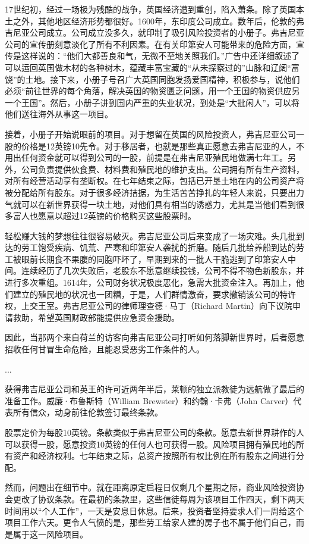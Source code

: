 \documentclass[12pt,oneside]{book}
\begin{document}
\begin{bookref}[frametitle={\cite{美国四百年}}]
17世纪初，经过一场极为残酷的战争，英国经济遭到重创，陷入萧条。除了英国本土之外，其他地区经济形势都很好。1600年，东印度公司成立。数年后，伦敦的弗吉尼亚公司成立。公司成立没多久，就印制了吸引风险投资者的小册子。弗吉尼亚公司的宣传册刻意淡化了所有不利因素。在有关印第安人可能带来的危险方面，宣传是这样说的：“他们大都善良和气，无微不至地关照我们。”广告中还详细叙述了可以运回英国做木材的各种树木，蕴藏丰富宝藏的“从未探察过的”山脉和辽阔“富饶”的土地。接下来，小册子号召广大英国同胞发扬爱国精神，积极参与，说他们必须“前往世界的每个角落，解决英国的物资匮乏问题，用一个王国的物资供应另一个王国”。然后，小册子讲到国内严重的失业状况，到处是“大批闲人”，可以将他们送往海外从事这一项目。

接着，小册子开始说眼前的项目。对于想留在英国的风险投资人，弗吉尼亚公司一股的价格是12英镑10先令。对于移居者，也就是那些真正愿意去弗吉尼亚的人，不用出任何资金就可以得到公司的一股，前提是在弗吉尼亚殖民地做满七年工。另外，公司负责提供伙食费、材料费和殖民地的维护支出。公司拥有所有生产资料，对所有经营活动享有垄断权。在七年结束之际，包括已开垦土地在内的公司资产将被分配给所有股东。对于很多经济拮据，为生活苦苦挣扎的年轻人来说，只要出力气就可以在新世界获得一块土地，对他们具有相当的诱惑力，尤其是当他们看到很多富人也愿意以超过12英镑的价格购买这些股票时。

轻松赚大钱的梦想往往很容易破灭。弗吉尼亚公司后来变成了一场灾难。头几批到达的劳工饱受疾病、饥荒、严寒和印第安人袭扰的折磨。随后几批给养船到达的劳工被眼前长期食不果腹的同胞吓坏了，早期到来的一批人干脆逃到了印第安人中间。连续经历了几次失败后，老股东不愿意继续投钱，公司不得不物色新股东，并进行多次重组。1614年，公司财务状况极度恶化，急需大批资金注入。再加上，他们建立的殖民地的状况也一团糟，于是，人们群情激奋，要求撤销该公司的特许权，上交王室。弗吉尼亚公司的律师理查德·马丁（Richard Martin）向下议院申请救助，希望英国财政部能提供应急资金援助。

因此，当那两个来自荷兰的访客向弗吉尼亚公司打听如何落脚新世界时，后者愿意招收任何甘冒生命危险，且能忍受恶劣工作条件的人。

...

获得弗吉尼亚公司和英王的许可近两年半后，莱顿的独立派教徒为远航做了最后的准备工作。威廉·布鲁斯特（William Brewster）和约翰·卡弗（John Carver）代表所有信众，动身前往伦敦签订最终条款。

股票定价为每股10英镑。条款类似于弗吉尼亚公司的条款。愿意去新世界耕作的人可以获得一股，愿意投资10英镑的任何人也可获得一股。风险项目拥有殖民地的所有资产和经济权利。七年结束之际，总资产按照所有权比例在所有股东之间进行分配。

然而，问题出在细节中。就在距离原定启程日仅剩几个星期之际，商业风险投资协会更改了协议条款。在最初的条款里，这些信徒每周为该项目工作四天，剩下两天时间用以“个人工作”，一天是安息日休息。后来，投资者坚持要求人们一周给这个项目工作六天。更令人气愤的是，那些劳工给家人建的房子也不属于他们自己，而是属于这一风险项目。


\end{bookref}
\end{document}
